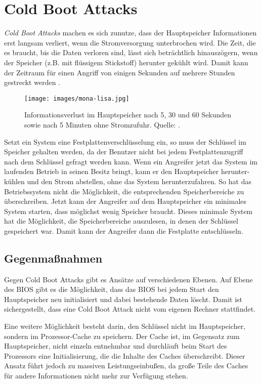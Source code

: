 \section{Cold Boot Attacks}
\emph{Cold Boot Attacks} machen es sich zunutze, dass der Hauptspeicher
Informationen erst langsam verliert, wenn die Stromversorgung
unterbrochen wird. Die Zeit, die es braucht, bis die Daten verloren
sind, lässt sich beträchtlich hinauszögern, wenn der Speicher (z.B. mit
flüssigem Stickstoff) herunter gekühlt wird. Damit kann der Zeitraum für
einen Angriff von einigen Sekunden auf mehrere Stunden gestreckt werden
\cite{Halderman08}.

\begin{figure}[h]
  \centering
  \texttt{[image: images/mona-lisa.jpg]}
  \caption{Informationsverlust im Hauptspeicher nach 5, 30 und 60 Sekunden sowie nach 5
    Minuten ohne Stromzufuhr. Quelle: \cite{Halderman08}.}
  \label{fig:mona-lisa}
\end{figure}

Setzt ein System eine Festplattenverschlüsselung ein, so muss der
Schlüssel im Speicher gehalten werden, da der Benutzer nicht bei jedem
Festplattenzugriff nach dem Schlüssel gefragt werden kann. Wenn ein
Angreifer jetzt das System im laufenden Betrieb in seinen Besitz bringt,
kann er den Hauptspeicher herunter-kühlen und den Strom abstellen, ohne
das System herunterzufahren. So hat das Betriebssystem nicht die
Möglichkeit, die entsprechenden Speicherbereiche zu überschreiben. Jetzt
kann der Angreifer auf dem Hauptspeicher ein minimales System starten,
dass möglichst wenig Speicher braucht. Dieses minimale System hat die
Möglichkeit, die Speicherbereiche auszulesen, in denen der Schlüssel
gespeichert war. Damit kann der Angreifer dann die Festplatte
entschlüsseln.

\subsection{Gegenmaßnahmen}
Gegen Cold Boot Attacks gibt es Ansätze auf verschiedenen Ebenen. Auf
Ebene des BIOS gibt es die Möglichkeit, dass das BIOS bei jedem Start
den Hauptspeicher neu initialisiert und dabei bestehende Daten
löscht. Damit ist sichergestellt, dass eine Cold Boot Attack nicht vom
eigenen Rechner stattfindet.

Eine weitere Möglichkeit besteht darin, den Schlüssel nicht im
Hauptspeicher, sondern im Prozessor-Cache zu speichern. Der Cache ist,
im Gegensatz zum Hauptspeicher, nicht einzeln entnehmbar und durchläuft
beim Start des Prozessors eine Initialisierung, die die Inhalte des
Caches überschreibt. Dieser Ansatz führt jedoch zu massiven
Leistungseinbußen, da große Teile des Caches für andere Informationen
nicht mehr zur Verfügung stehen.
